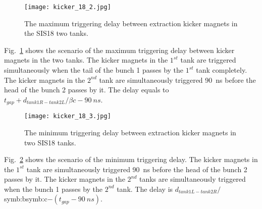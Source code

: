 \begin{figure}[H]
   \centering   
   \texttt{[image: kicker\_18\_2.jpg]}
   \caption{The maximum triggering delay between extraction kicker magnets in the SIS18 two tanks.}
   \label{kicker_18_2}
\end{figure}
Fig.~\ref{kicker_18_2} shows the scenario of the maximum triggering delay between kicker magnets in the two tanks. The kicker magnets in the $1^{st}$ tank are triggered simultaneously when the tail of the bunch 1 passes by the $1^{st}$ tank completely. The kicker magnets in the $2^{nd}$ tank are simultaneously triggered \SI{90}{ns} before the head of the bunch 2 passes by it. The delay equals to $t_\mathit{gap}+d_\mathit{tank1R-tank2L}/\beta c-\SI{90}{ns}$.
\begin{figure}[H]
   \centering   
   \texttt{[image: kicker\_18\_3.jpg]}
   \caption{The minimum triggering delay between extraction kicker magnets in two SIS18 tanks.}
   \label{kicker_18_3}
\end{figure}
Fig.~\ref{kicker_18_3} shows the scenario of the minimum triggering delay. The kicker magnets in the $1^{st}$ tank are simultaneously triggered \SI{90}{ns} before the head of the bunch 2 passes by it. The kicker magnets in the $2^{nd}$ tanks are simultaneously triggered when the bunch 1 passes by the $2^{nd}$ tank. The delay is $d_\mathit{tank1L-tank2R}/$\gls{symb:b}\gls{symb:c}$-(t_\mathit{gap}-\SI{90}{ns})$.

